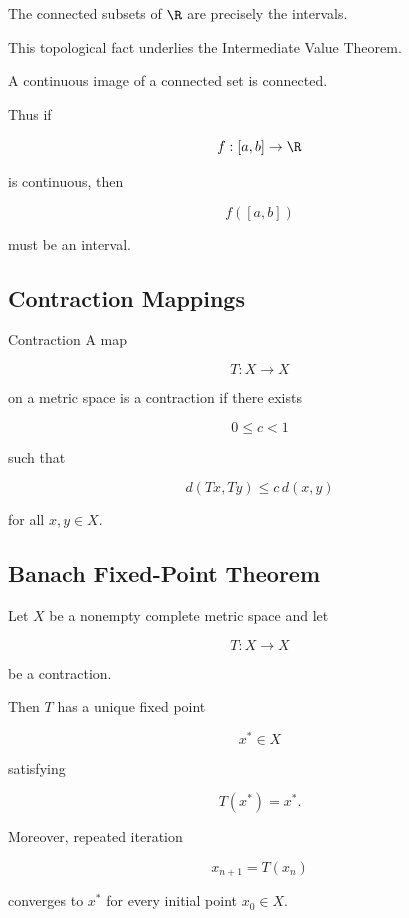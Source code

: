 The connected subsets of \(\R\) are precisely the intervals.

This topological fact underlies the Intermediate Value Theorem.

A continuous image of a connected set is connected.

Thus if

\[
f:[a,b]\to\R
\]

is continuous, then

\[
f([a,b])
\]

must be an interval.

\subsection{Contraction Mappings}
\label{subsec:contraction-mappings-analysis}

\begin{definitionbox}{Contraction}
A map

\[
T:X\to X
\]

on a metric space is a contraction if there exists

\[
0\leq c<1
\]

such that

\[
\boxed{
d(Tx,Ty)
\leq
c\,d(x,y)
}
\]

for all \(x,y\in X\).
\end{definitionbox}

\subsection{Banach Fixed-Point Theorem}
\label{subsec:banach-fixed-point}

\begin{theorem}
Let \(X\) be a nonempty complete metric space and let

\[
T:X\to X
\]

be a contraction.

Then \(T\) has a unique fixed point

\[
x^*\in X
\]

satisfying

\[
\boxed{
T(x^*)=x^*.
}
\]

Moreover, repeated iteration

\[
x_{n+1}=T(x_n)
\]

converges to \(x^*\) for every initial point \(x_0\in X\).
\end{theorem}


